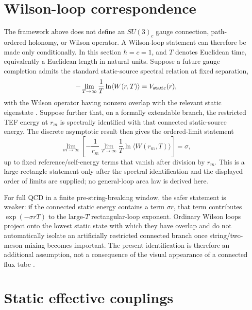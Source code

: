 \documentclass[10pt]{article}
\begin{document}
\section{Wilson-loop correspondence}
\label{sec:wilson}

The framework above does not define an $SU(3)_c$ gauge connection, path-ordered holonomy, or Wilson operator. A Wilson-loop statement can therefore be made only conditionally. In this section $\hbar=c=1$, and $T$ denotes Euclidean time, equivalently a Euclidean length in natural units. Suppose a future gauge completion admits the standard static-source spectral relation at fixed separation,
\begin{equation}
-\lim_{T\to\infty}\frac{1}{T}\ln\langle W(r,T)\rangle
=V_{\rm static}(r),
\label{eq:WilsonStatic}
\end{equation}
with the Wilson operator having nonzero overlap with the relevant static eigenstate \cite{Wilson1974,BaliSchilling1992}. Suppose further that, on a formally extendable branch, the restricted TEF energy at $r_m$ is spectrally identified with that connected static-source energy. The discrete asymptotic result then gives the ordered-limit statement
\begin{equation}
\boxed{
\lim_{m\to\infty}
\left[
-\frac{1}{r_m}
\lim_{T\to\infty}
\frac{1}{T}\ln\langle W(r_m,T)\rangle
\right]
=\sigma,
}
\label{eq:WilsonOrderedLimit}
\end{equation}
up to fixed reference/self-energy terms that vanish after division by $r_m$. This is a large-rectangle statement only after the spectral identification and the displayed order of limits are supplied; no general-loop area law is derived here.

For full QCD in a finite pre-string-breaking window, the safer statement is weaker: if the connected static energy contains a term $\sigma r$, that term contributes $\exp(-\sigma rT)$ to the large-$T$ rectangular-loop exponent. Ordinary Wilson loops project onto the lowest static state with which they have overlap and do not automatically isolate an artificially restricted connected branch once string/two-meson mixing becomes important. The present identification is therefore an additional assumption, not a consequence of the visual appearance of a connected flux tube \cite{Bulava2024,BaliStringBreaking2005}.

\section{Static effective couplings}
\label{sec:couplings}
\end{document}
